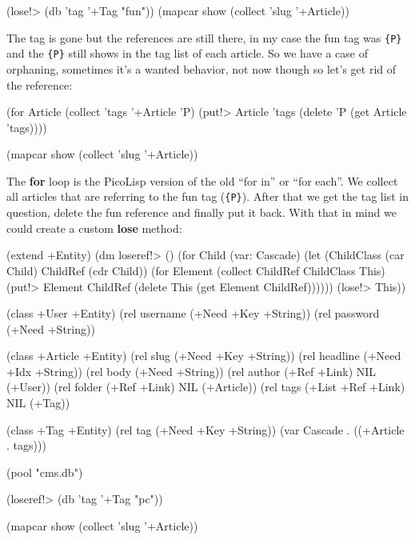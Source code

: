 \begin{wideverbatim}
(lose!> (db 'tag '+Tag "fun"))
(mapcar show (collect 'slug '+Article))
\end{wideverbatim}

The tag is gone but the references are still there, in my case the fun
tag was \texttt{\{P\}} and the \texttt{\{P\}} still shows in the tag
list of each article. So we have a case of orphaning, sometimes it's a
wanted behavior, not now though so let's get rid of the reference:

\begin{wideverbatim}
(for Article (collect 'tags '+Article '{P})
     (put!> Article 'tags (delete '{P} (get Article 'tags))))

(mapcar show (collect 'slug '+Article))
\end{wideverbatim}


The \textbf{for} loop is the PicoLisp version of the old ``for in'' or
``for each''. We collect all articles that are referring to the fun
tag (\texttt{\{P\}}). After that we get the tag list in question, delete the
fun reference and finally put it back. With that in mind we could
create a custom \textbf{lose} method:

\begin{wideverbatim}
(extend +Entity)
(dm loseref!> ()
    (for Child (var: Cascade) 
         (let (ChildClass (car Child) ChildRef (cdr Child)) 
           (for Element (collect ChildRef ChildClass This)
                (put!> Element ChildRef (delete This (get Element ChildRef))))))
    (lose!> This))

(class +User +Entity)
(rel username (+Need +Key +String))
(rel password (+Need +String))

(class +Article +Entity)
(rel slug     (+Need +Key +String))
(rel headline (+Need +Idx +String))
(rel body     (+Need +String))
(rel author   (+Ref +Link) NIL (+User))
(rel folder   (+Ref +Link) NIL (+Article))
(rel tags     (+List +Ref +Link) NIL (+Tag))

\end{wideverbatim}

\begin{wideverbatim}

(class +Tag +Entity)
(rel tag (+Need +Key +String))
(var Cascade . ((+Article . tags)))

(pool "cms.db")

(loseref!> (db 'tag '+Tag "pc"))

(mapcar show (collect 'slug '+Article))
\end{wideverbatim}

